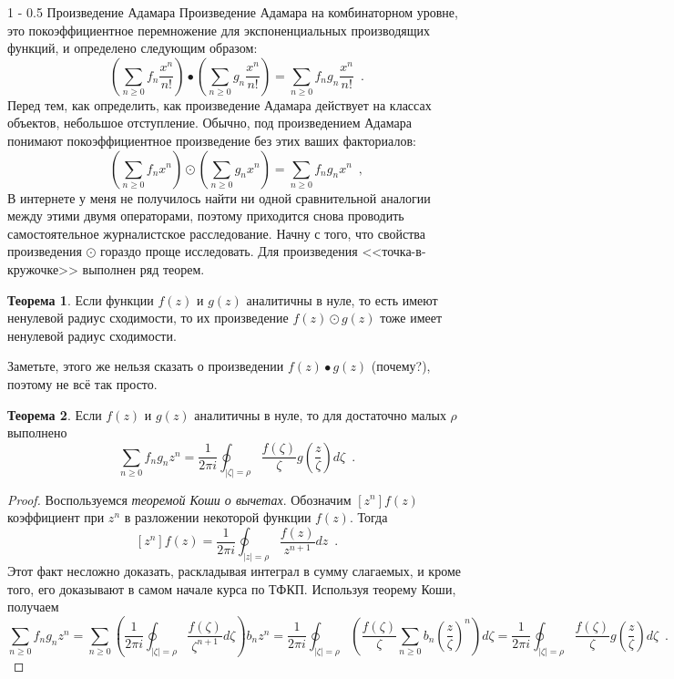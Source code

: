 \documentclass{article}
\makeatletter
\theoremstyle{definition}
\newtheorem*{theorem}{Теорема}
\renewcommand{\subsection}{\@startsection
{subsection}%
{1}%
{\z@}%
{-\baselineskip}%
{0.5\baselineskip}%
{\centering\large\scshape}} %
\makeatother
\begin{document}
\subsection{Произведение Адамара}
Произведение Адамара на комбинаторном уровне, это покоэффициентное перемножение
для экспоненциальных производящих функций, и определено следующим образом:
\[
    \left(
        \sum_{n \geq 0} f_n \dfrac{x^n}{n!}
    \right) \bullet
    \left(
        \sum_{n \geq 0} g_n \dfrac{x^n}{n!}
    \right)  = 
    \sum_{n \geq 0} f_n g_n \dfrac{x^n}{n!} \enspace .
\]
Перед тем, как определить, как произведение Адамара действует на классах
объектов, небольшое отступление.
Обычно, под произведением Адамара понимают покоэффициентное произведение без
этих ваших факториалов:
\[
    \left(
        \sum_{n \geq 0} f_n x^n
    \right) \odot
    \left(
        \sum_{n \geq 0} g_n x^n
    \right)  =
    \sum_{n \geq 0} f_n g_n x^n \enspace , 
\]
В интернете у меня не получилось найти
ни одной сравнительной аналогии между этими двумя операторами, поэтому
приходится снова проводить самостоятельное журналистское расследование.
Начну с того, что свойства произведения \( \odot \) гораздо проще исследовать. Для произведения
<<точка-в-кружочке>> выполнен ряд теорем.
\begin{theorem}
    Если функции \( f(z) \) и \( g(z) \) аналитичны в нуле, то есть имеют
ненулевой радиус сходимости, то их произведение \( f(z) \odot g(z) \) тоже имеет
ненулевой радиус сходимости.
\end{theorem}
Заметьте, этого же нельзя сказать о произведении \( f(z) \bullet g(z) \)
(почему?), поэтому не всё так просто.
\begin{theorem}
Если \( f(z) \) и \( g(z) \) аналитичны в нуле, то для достаточно малых \( \rho
\) выполнено
    \[
    \sum_{n \geq 0} f_n g_n z^n = \dfrac{1}{2\pi i} \oint_{|\zeta| = \rho}
\dfrac{f(\zeta)}{\zeta} g \left( \dfrac{z}{\zeta} \right) d \zeta
    \enspace .
\]
\end{theorem}
\begin{proof}
Воспользуемся \textit{теоремой Коши о вычетах}. Обозначим \( [z^n]f(z) \)
коэффициент при \( z^n \) в разложении некоторой функции \( f(z) \). Тогда
\[
    [z^n] f(z) = \dfrac{1}{2\pi i} \oint_{|z| = \rho} \dfrac{f(z)}{z^{n+1}} dz
\enspace .
\]
Этот факт несложно доказать, раскладывая интеграл в сумму слагаемых, и кроме
того, его доказывают в самом начале курса по ТФКП. Используя теорему Коши,
получаем
\[
    \sum_{n \geq 0} f_n g_n z^n = \sum_{n \geq 0} \left(
        \dfrac{1}{2\pi i} \oint_{|\zeta| = \rho} \dfrac{f(\zeta)}{\zeta^{n+1}} d
\zeta
    \right) b_n z^n = \dfrac{1}{2\pi i} \oint_{|\zeta| = \rho}
\left(
    \dfrac{f(\zeta)}{\zeta} \sum_{n \geq 0} b_n \left( \dfrac{z}{\zeta}
\right)^n
\right) d \zeta = \dfrac{1}{2\pi i} \oint_{|\zeta| = \rho}
\dfrac{f(\zeta)}{\zeta} g\left( \dfrac z \zeta \right) d \zeta \enspace .
\]
\end{proof}
\end{document}
